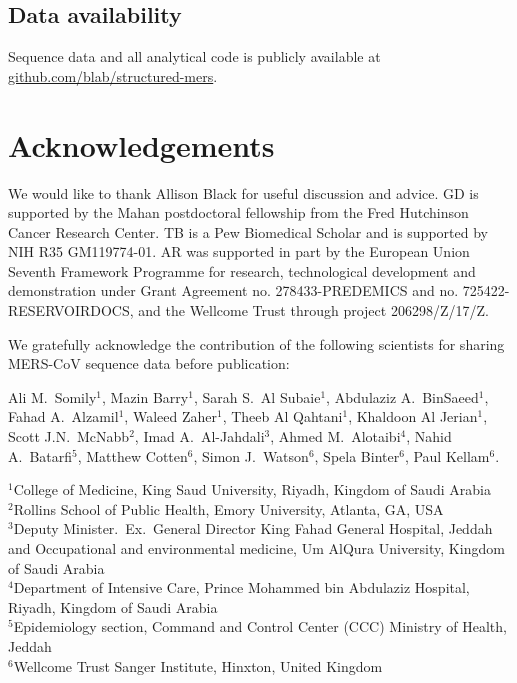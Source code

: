 \documentclass[11pt,oneside,letterpaper]{article}
\begin{document}
\subsection*{Data availability}
Sequence data and all analytical code is publicly available at \href{https://github.com/blab/structured-mers}{github.com/blab/structured-mers}.

\section*{Acknowledgements}
We would like to thank Allison Black for useful discussion and advice.
GD is supported by the Mahan postdoctoral fellowship from the Fred Hutchinson Cancer Research Center.
TB is a Pew Biomedical Scholar and is supported by NIH R35 GM119774-01.
AR was supported in part by the European Union Seventh Framework Programme for research, technological development and demonstration under Grant Agreement no. 278433-PREDEMICS and no. 725422-RESERVOIRDOCS, and the Wellcome Trust through project 206298/Z/17/Z.

We gratefully acknowledge the contribution of the following scientists for sharing MERS-CoV sequence data before publication:

Ali M.\ Somily$^{1}$, Mazin Barry$^{1}$, Sarah S.\ Al Subaie$^{1}$, Abdulaziz A.\ BinSaeed$^{1}$, Fahad A.\ Alzamil$^{1}$, Waleed Zaher$^{1}$, Theeb Al Qahtani$^{1}$, Khaldoon Al Jerian$^{1}$, Scott J.N.\ McNabb$^{2}$, Imad A.\ Al-Jahdali$^{3}$, Ahmed M.\ Alotaibi$^{4}$, Nahid A.\ Batarfi$^{5}$, Matthew Cotten$^{6}$, Simon J.\ Watson$^{6}$, Spela Binter$^{6}$, Paul Kellam$^{6}$.


$^{1}$College of Medicine, King Saud University, Riyadh, Kingdom of Saudi Arabia \\
$^{2}$Rollins School of Public Health, Emory University, Atlanta, GA, USA \\
$^{3}$Deputy Minister.\ Ex.\ General Director King Fahad General Hospital, Jeddah and Occupational and environmental medicine, Um AlQura University, Kingdom of Saudi Arabia \\
$^{4}$Department of Intensive Care, Prince Mohammed bin Abdulaziz Hospital, Riyadh, Kingdom of Saudi Arabia \\
$^{5}$Epidemiology section, Command and Control Center (CCC) Ministry of Health, Jeddah \\
$^{6}$Wellcome Trust Sanger Institute, Hinxton, United Kingdom \\




\end{document}
